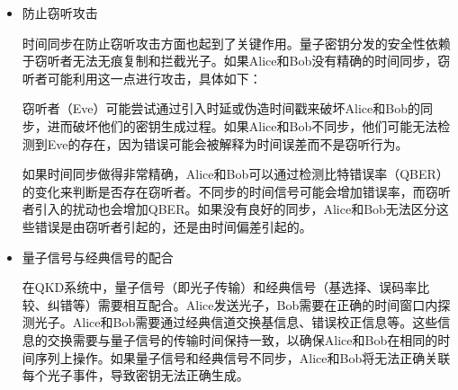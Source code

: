 \begin{itemize}
	通过精确的时间同步，Bob可以在正确的时间窗口内探测光子，减少探测错误。这样可以确保更多的有效光子被正确接收，增加最终密钥生成的效率。如果没有时间同步，很多有效光子可能会因为Bob的探测窗口偏移而未被检测到，导致光子浪费。时间同步能够确保Alice发送的每个光子尽可能地被Bob接收到。
	
	\item 防止窃听攻击
	
	时间同步在防止窃听攻击方面也起到了关键作用。量子密钥分发的安全性依赖于窃听者无法无痕复制和拦截光子。如果Alice和Bob没有精确的时间同步，窃听者可能利用这一点进行攻击，具体如下：
	
	窃听者（Eve）可能尝试通过引入时延或伪造时间戳来破坏Alice和Bob的同步，进而破坏他们的密钥生成过程。如果Alice和Bob不同步，他们可能无法检测到Eve的存在，因为错误可能会被解释为时间误差而不是窃听行为。
	
	如果时间同步做得非常精确，Alice和Bob可以通过检测比特错误率（QBER）的变化来判断是否存在窃听者。不同步的时间信号可能会增加错误率，而窃听者引入的扰动也会增加QBER。如果没有良好的同步，Alice和Bob无法区分这些错误是由窃听者引起的，还是由时间偏差引起的。
	
	\item 量子信号与经典信号的配合
	
	在QKD系统中，量子信号（即光子传输）和经典信号（基选择、误码率比较、纠错等）需要相互配合。Alice发送光子，Bob需要在正确的时间窗口内探测光子。Alice和Bob需要通过经典信道交换基信息、错误校正信息等。这些信息的交换需要与量子信号的传输时间保持一致，以确保Alice和Bob在相同的时间序列上操作。如果量子信号和经典信号不同步，Alice和Bob将无法正确关联每个光子事件，导致密钥无法正确生成。
\end{itemize}

